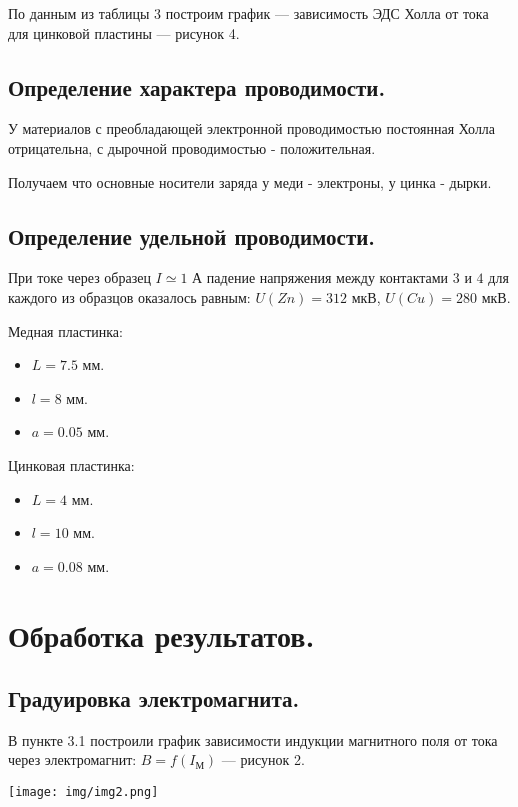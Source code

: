 \documentclass[12pt,a4paper]{article}
\begin{document}
            По данным из таблицы 3 построим график --- зависимость ЭДС Холла от тока для цинковой пластины --- рисунок 4.
            
    \subsection{Определение характера проводимости.}
        У материалов с преобладающей электронной проводимостью постоянная Холла отрицательна, с дырочной проводимостью - положительная. 
        
        Получаем что основные носители заряда у меди - электроны, у цинка - дырки.

    \subsection{Определение удельной проводимости.}
        При токе через образец $I \simeq 1$ А падение напряжения между контактами $3$ и $4$ для каждого из образцов оказалось равным: $U(Zn) = 312$ мкВ, $U(Cu) = 280$ мкВ.
        
        Медная пластинка:
        \begin{itemize}
            \item $L = 7.5$ мм.
            \item $l = 8$ мм.
            \item $a = 0.05$ мм.
        \end{itemize}
        
        Цинковая пластинка:
        \begin{itemize}
            \item $L = 4$ мм.
            \item $l = 10$ мм.
            \item $a = 0.08$ мм.
        \end{itemize}
\newpage        
\section{Обработка результатов.}
    \subsection{Градуировка электромагнита.}
        В пункте 3.1 построили график зависимости индукции магнитного поля от тока через электромагнит: $B = f(I_\text{М})$ --- рисунок 2.
        
        \texttt{[image: img/img2.png]}
	
\end{document}
